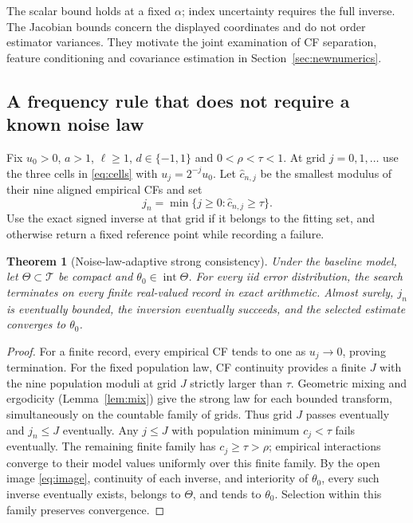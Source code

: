 \documentclass[11pt,a4paper]{article}
\newtheorem{theorem}{Theorem}[section]
\theoremstyle{remark}\newtheorem{remark}[theorem]{Remark}
\begin{document}
The scalar bound holds at a fixed $\alpha$; index uncertainty requires the full inverse. The Jacobian bounds concern the displayed coordinates and do not order estimator variances. They motivate the joint examination of CF separation, feature conditioning and covariance estimation in Section~\ref{sec:newnumerics}.

\subsection{A frequency rule that does not require a known noise law}
Fix $u_0>0$, $a>1$, $\ell\ge1$, $d\in\{-1,1\}$ and $0<\rho<\tau<1$. At grid $j=0,1,\ldots$ use the three cells in \eqref{eq:cells} with $u_j=2^{-j}u_0$. Let $\widehat c_{n,j}$ be the smallest modulus of their nine aligned empirical CFs and set
\[
j_n=\min\{j\ge0:\widehat c_{n,j}\ge\tau\}.
\]
Use the exact signed inverse at that grid if it belongs to the fitting set, and otherwise return a fixed reference point while recording a failure.

\begin{theorem}[Noise-law-adaptive strong consistency]\label{thm:adaptive}
Under the baseline model, let $\Theta\subset\mathcal T$ be compact and $\theta_0\in\operatorname{int}\Theta$. For every iid error distribution, the search terminates on every finite real-valued record in exact arithmetic. Almost surely, $j_n$ is eventually bounded, the inversion eventually succeeds, and the selected estimate converges to $\theta_0$.
\end{theorem}
\begin{proof}
For a finite record, every empirical CF tends to one as $u_j\to0$, proving termination. For the fixed population law, CF continuity provides a finite $J$ with the nine population moduli at grid $J$ strictly larger than $\tau$. Geometric mixing and ergodicity (Lemma~\ref{lem:mix}) give the strong law for each bounded transform, simultaneously on the countable family of grids. Thus grid $J$ passes eventually and $j_n\le J$ eventually. Any $j\le J$ with population minimum $c_j<\tau$ fails eventually. The remaining finite family has $c_j\ge\tau>\rho$; empirical interactions converge to their model values uniformly over this finite family. By the open image \eqref{eq:image}, continuity of each inverse, and interiority of $\theta_0$, every such inverse eventually exists, belongs to $\Theta$, and tends to $\theta_0$. Selection within this family preserves convergence.
\end{proof}
\end{document}
